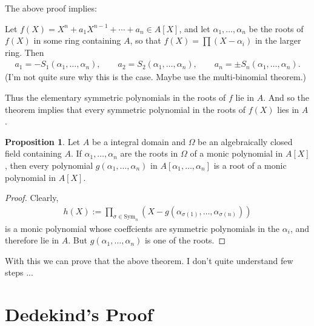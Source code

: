 \documentclass[a4paper]{book}
\theoremstyle{definition}
\newtheorem{proposition}[definition]{Proposition}
\begin{document}
The above proof implies:

Let \(f(X) = X^n + a_1 X^{n-1} + \cdots + a_n \in A[X]\), and let \(\alpha_1, \ldots, \alpha_n\) be the roots of \(f(X)\) in some ring containing \(A\), so that \(f(X) = \prod (X - \alpha_i)\) in the larger ring. Then
\begin{align*}
    a_1 = -S_1(\alpha_1, \ldots, \alpha_n), \qquad a_2 = S_2(\alpha_1, \ldots, \alpha_n), \qquad a_n = \pm S_n(\alpha_1, \ldots, \alpha_n) \text{.}
\end{align*}
(I'm not quite sure why this is the case. Maybe use the multi-binomial theorem.)

Thus the elementary symmetric polynomials in the roots of \(f\) lie in \(A\). And so the theorem implies that every symmetric polynomial in the roots of \(f(X)\) lies in \(A\).
\begin{thmbox}
    \begin{proposition}
        Let \(A\) be a integral domain and \(\Omega\) be an algebraically closed field containing \(A\). If \(\alpha_1, \ldots, \alpha_n\) are the roots in \(\Omega\) of a monic polynomial in \(A[X]\), then every polynomial \(g(\alpha_1, \ldots, \alpha_n)\) in \(A[\alpha_1, \ldots, \alpha_n]\) is a root of a monic polynomial in \(A[X]\).
    \end{proposition}
\end{thmbox}
\begin{proof}
    Clearly,
    \begin{align*}
        h(X) := \prod_{\sigma \in \mathrm{Sym}_n} (X -  g(\alpha_{\sigma(1)}, \ldots, \alpha_{\sigma(n  )}))
    \end{align*}
    is a monic polynomial whose coeffcients are symmetric polynomials in the \(\alpha_i\), and therefore lie in \(A\). But \(g(\alpha_1, \ldots, \alpha_n)\) is one of the roots.
\end{proof}
With this we can prove that the above theorem. I don't quite understand few steps ...

\section*{Dedekind's Proof}
\end{document}
